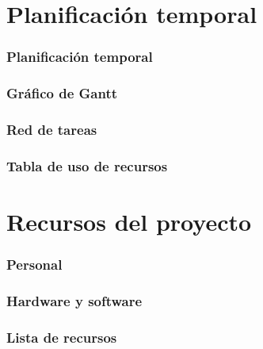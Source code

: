 \documentclass[spanish,a4paper,12pt]{report}	%
\begin{document}
\newpage
\mbox{}
\thispagestyle{empty}						%
\newpage
\setcounter{section}{0}

\part{Planificación temporal}

	\section{Planificación temporal}

	\section{Gráfico de  Gantt}

	\section{Red de tareas}

	\section{Tabla de uso de recursos}

\newpage
\mbox{}
\thispagestyle{empty}						%
\newpage
\setcounter{section}{0}


\part{Recursos del proyecto}

	\section{Personal}

	\section{Hardware y software}

	\section{Lista de recursos}

\newpage
\mbox{}
\thispagestyle{empty}						%
\newpage
\setcounter{section}{0}

\end{document}
